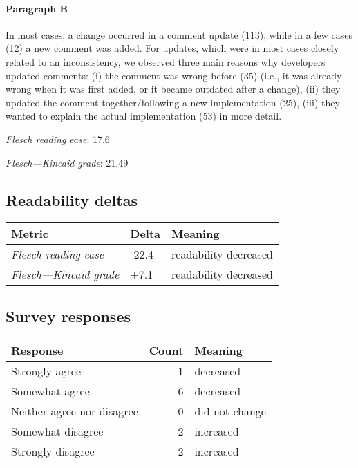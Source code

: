 \paragraph{Paragraph B}
In most cases, a change occurred in a comment update (113), while in a few cases (12) a new comment was added. For updates, which were in most cases closely related to an inconsistency, we observed three main reasons why developers updated comments: (i) the comment was wrong before (35) (i.e., it was already wrong when it was first added, or it became outdated after a change), (ii) they updated the comment together/following a new implementation (25), (iii) they wanted to explain the actual implementation (53) in more detail.\par\medskip
\emph{Flesch reading ease}: 17.6\par
\emph{Flesch---Kincaid grade}: 21.49

\subsection{Readability deltas}

\begin{tabular}{lll}
\toprule
               \textbf{Metric} & \textbf{Delta} &       \textbf{Meaning} \\
\midrule
    \emph{Flesch reading ease} &          -22.4 &  readability decreased \\
 \emph{Flesch---Kincaid grade} &           +7.1 &  readability decreased \\
\bottomrule
\end{tabular}

\subsection{Survey responses}
\begin{tabular}{lrl}
\toprule
          \textbf{Response} &  \textbf{Count} & \textbf{Meaning} \\
\midrule
             Strongly agree &               1 &        decreased \\
             Somewhat agree &               6 &        decreased \\
 Neither agree nor disagree &               0 &   did not change \\
          Somewhat disagree &               2 &        increased \\
          Strongly disagree &               2 &        increased \\
\bottomrule
\end{tabular}

